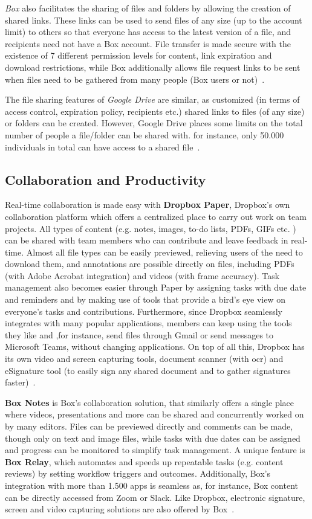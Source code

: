\textit{Box} also facilitates the sharing of files and folders by allowing the creation of shared links. These links can be used to send files of any size (up to the account limit) to others so that everyone has access to the latest version of a file, and recipients need not have a Box account. File transfer is made secure with the existence of 7 different permission levels for content, link expiration and download restrictions, while Box additionally allows file request links to be sent when files need to be gathered from many people (Box users or not)~\cite{box}.

The file sharing features of \textit{Google Drive} are similar, as customized (in terms of access control, expiration policy, recipients etc.) shared links to files (of any size) or folders can be created. However, Google Drive places some limits on the total number of people a file/folder can be shared with. for instance, only 50.000 individuals in total can have access to a shared file~\cite{google_drive,drive_sharing_limits}.

\subsection{Collaboration and Productivity}
Real-time collaboration is made easy with \textbf{Dropbox Paper}, Dropbox's own collaboration platform which offers a centralized place to carry out work on team projects. All types of content (e.g. notes, images, to-do lists, PDFs, GIFs etc. ) can be shared with team members who can contribute and leave feedback in real-time. Almost all file types can be easily previewed, relieving users of the need to download them, and annotations are possible directly on files, including PDFs (with Adobe Acrobat integration) and videos (with frame accuracy). Task management also becomes easier through Paper by assigning tasks with due date and reminders and by making use of tools that provide a bird's eye view on everyone's tasks and contributions. Furthermore, since Dropbox seamlessly integrates with many popular applications, members can keep using the tools they like and ,for instance, send files through Gmail or send messages to Microsoft Teams, without changing applications. On top of all this, Dropbox has its own video and screen capturing tools, document scanner (with \ac{ocr}) and eSignature tool (to easily sign any shared document and to gather signatures faster)~\cite{dropbox,dropbox_requests}.

\textbf{Box Notes} is Box's collaboration solution, that similarly offers a single place where videos, presentations and more can be shared and concurrently worked on by many editors. Files can be previewed directly and comments can be made, though only on text and image files, while tasks with due dates can be assigned and progress can be monitored to simplify task management. A unique feature is \textbf{Box Relay}, which automates and speeds up repeatable tasks (e.g. content reviews) by setting workflow triggers and outcomes. Additionally, Box's integration with more than 1.500 apps is seamless as, for instance, Box content can be directly accessed from Zoom or Slack. Like Dropbox, electronic signature, screen and video capturing solutions are also offered by Box~\cite{box,box_annotations}.

